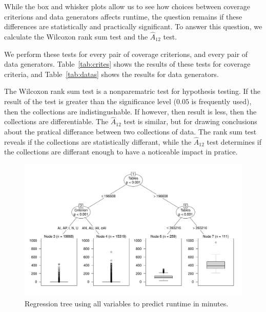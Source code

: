 While the box and whisker plots allow us to see how choices between coverage criterions and data generators affects
runtime, the question remains if these differences are statistically and practically significant. To answer this
question, we calculate the Wilcoxon rank sum test and the $\hat{A}_{12}$ test.

We perform these tests for every pair of coverage criterions, and every pair of data generators.  Table~\ref{tab:crites}
shows the results of these tests for coverage criteria, and Table~\ref{tab:datas} shows the results for data generators.

The Wilcoxon rank sum test is a nonparematric test for hypothesis
testing.  If the result of the test is greater than the significance
level ($0.05$ is frequently used), then the collections are
indistingushable.  If however, then result is less, then the collections
are differentiable.  The $\hat{A}_{12}$ test is similar, but for drawing
conclusions about the pratical differance between two collections of
data.  The rank sum test reveals if the collections are statistically differant, while
the $\hat{A}_{12}$ test determines if the collections are differant
enough to have a noticeable impact in pratice.



\begin{figure}
\centering
  \centering
  \includegraphics[width=.75\linewidth]{diagrams/AllTree.pdf}
  \caption{Regression tree using all variables to predict runtime in
  minutes. \vspace{-.15in}}
  \label{fig:atree}
  \vspace{-.15in}
\end{figure}

